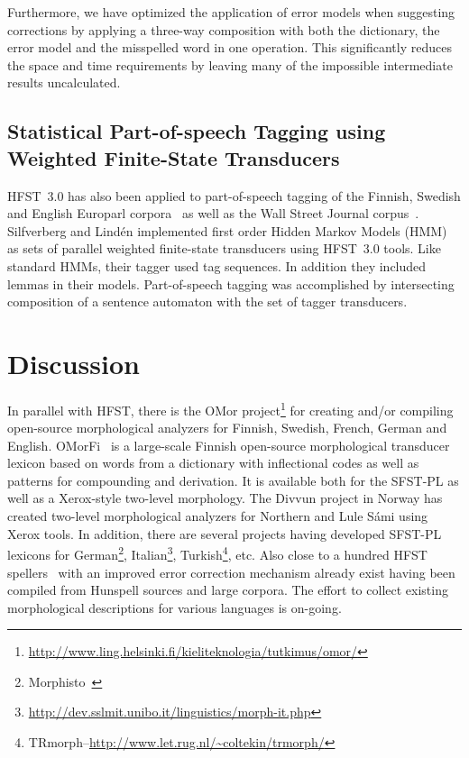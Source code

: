\documentclass{llncs}
\begin{document}
Furthermore, we have optimized the application of error models when suggesting corrections
by applying a three-way composition with both the dictionary, the error model and the misspelled word in
one operation. This significantly reduces the space and time requirements by leaving many of the impossible
intermediate results uncalculated.

\subsection{Statistical Part-of-speech Tagging using Weighted Finite-State Transducers}
HFST~3.0 has also been applied to part-of-speech tagging of the Finnish, Swedish
and English Europarl corpora~\cite{silfverberg/2010} as well as the Wall Street Journal 
corpus~\cite{silfverberg/2011}. Silfverberg and
Lind\'{e}n implemented first order Hidden Markov Models (HMM) as sets
of parallel weighted finite-state transducers using HFST~3.0 tools. Like
standard HMMs, their tagger used tag sequences. In addition they
included lemmas in their models. Part-of-speech tagging was
accomplished by intersecting composition of a sentence automaton with
the set of tagger transducers.

\section{Discussion}\label{hfst:discussion}
In parallel with HFST, there is the OMor 
project\footnote{\url{http://www.ling.helsinki.fi/kieliteknologia/tutkimus/omor/}} for 
creating and/or compiling open-source morphological analyzers for Finnish, Swedish, 
French, German and English. OMorFi~\cite{pirinen/2011} is a large-scale Finnish open-source morphological 
transducer lexicon based on words from a dictionary with inflectional codes as well as 
patterns for compounding and derivation. It is available both for the SFST-PL
as well as a Xerox-style two-level morphology. The Divvun project in Norway 
has created two-level morphological analyzers for Northern and Lule Sámi using 
Xerox tools. In addition, there are several projects having developed SFST-PL lexicons for 
German\footnote{Morphisto~\cite{zielinski/2009}}, 
Italian\footnote{\url{http://dev.sslmit.unibo.it/linguistics/morph-it.php}}, Turkish\footnote{TRmorph--\url{http://www.let.rug.nl/~coltekin/trmorph/}}, etc.
Also close to a hundred HFST 
spellers~\cite{pirinen/2010/cla} with an improved error correction mechanism 
already exist having been compiled from Hunspell sources and large corpora.
The effort to collect existing morphological descriptions
for various languages is on-going.
\end{document}

